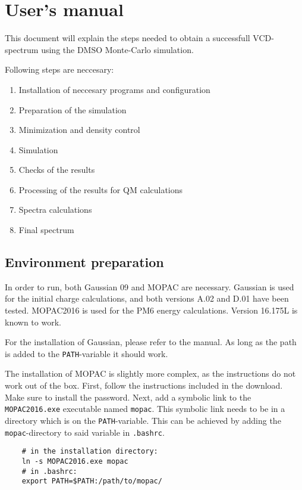\documentclass[a4paper,fleqn]{report}
\begin{document}
	
	\chapter{User's manual}

	
	This document will explain the steps needed to obtain a successfull VCD-spectrum using the DMSO Monte-Carlo simulation.
	
	Following steps are neccesary:
	\begin{enumerate}
		\setlength{\itemsep}{-1pt}
		\setlength{\parsep}{-1pt}
		\item Installation of neccesary programs and configuration
		\item Preparation of the simulation
		\item Minimization and density control
		\item Simulation
		\item Checks of the results
		\item Processing of the results for QM calculations
		\item Spectra calculations
		\item Final spectrum
	\end{enumerate}
	
	\section{Environment preparation}
	In order to run, both Gaussian 09 and MOPAC are necessary. Gaussian is used for the initial charge calculations, and both versions A.02 and D.01 have been tested.
	MOPAC2016 is used for the PM6 energy calculations. Version 16.175L is known to work.
	
	For the installation of Gaussian, please refer to the manual. As long as the path is added to the \verb|PATH|-variable it should work.
	
	The installation of MOPAC is slightly more complex, as the instructions do not work out of the box.
	First, follow the instructions included in the download. Make sure to install the password.
	Next, add a symbolic link to the \verb|MOPAC2016.exe| executable named \verb|mopac|.
	This symbolic link needs to be in a directory which is on the \verb|PATH|-variable. This can be achieved by adding the \verb|mopac|-directory to said variable in \verb|.bashrc|.
	
	\begin{lstlisting}
	# in the installation directory:
	ln -s MOPAC2016.exe mopac
	# in .bashrc:
	export PATH=$PATH:/path/to/mopac/
	\end{lstlisting}
	
	
	
\end{document}
